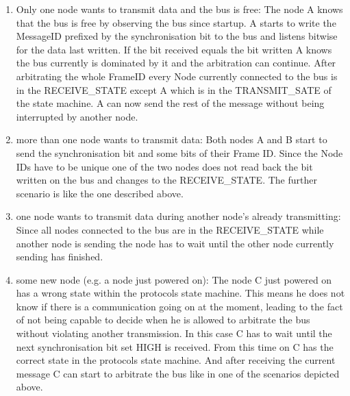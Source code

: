 \documentclass[11pt,a4paper,oneside]{report}
\begin{document}
\begin{enumerate}
 \item Only one node wants to transmit data and the bus is free: The node A knows that the bus is free by observing the bus since startup. A starts to write the MessageID prefixed by the synchronisation bit to the bus and listens bitwise for the data last written.
       If the bit received equals the bit written A knows the bus currently is dominated by it and the arbitration can continue. After arbitrating the whole FrameID every Node currently connected to the bus is in the RECEIVE\_STATE except A which is in the TRANSMIT\_SATE of the state machine.
       A can now send the rest of the message without being interrupted by another node.

 \item more than one node wants to transmit data: Both nodes A and B start to send the synchronisation bit and some bits of their Frame ID. Since the Node IDs have to be unique one of the two nodes does not read back the bit written on the bus and changes to the RECEIVE\_STATE. The further scenario is like the one described above.

 \item one node wants to transmit data during another node's already transmitting: Since all nodes connected to the bus are in the RECEIVE\_STATE while another node is sending the node has to wait until the other node currently sending has finished.

 \item some new node (e.g. a node just powered on): The node C just powered on has a wrong state within the protocols state machine. This means he does not know if there is a communication going on at the moment, leading to the fact of not being capable to decide when he is allowed to arbitrate the bus without violating another transmission.
       In this case C has to wait until the next synchronisation bit set HIGH is received. From this time on C has the correct state in the protocols state machine. And after receiving the current message C can start to arbitrate the bus like in one of the scenarios depicted above.
\end{enumerate}
\end{document}
